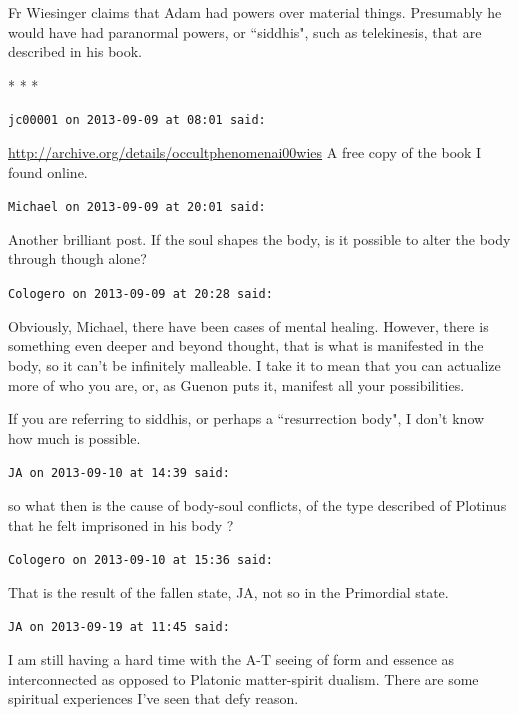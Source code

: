 Fr Wiesinger claims that Adam had powers over material things. Presumably he would have had paranormal powers, or ``siddhis", such as telekinesis, that are described in his book.



\begin{center}* * *\end{center}

\begin{footnotesize}\begin{sffamily}

\texttt{jc00001 on 2013-09-09 at 08:01 said: }

\url{http://archive.org/details/occultphenomenai00wies} A free copy of the book I found online.


\hfill

\texttt{Michael on 2013-09-09 at 20:01 said: }

Another brilliant post. If the soul shapes the body, is it possible to alter the body through though alone?


\hfill

\texttt{Cologero on 2013-09-09 at 20:28 said: }

Obviously, Michael, there have been cases of mental healing. However, there is something even deeper and beyond thought, that is what is manifested in the body, so it can't be infinitely malleable. I take it to mean that you can actualize more of who you are, or, as Guenon puts it, manifest all your possibilities.

If you are referring to siddhis, or perhaps a ``resurrection body", I don't know how much is possible.


\hfill

\texttt{JA on 2013-09-10 at 14:39 said: }

so what then is the cause of body-soul conflicts, of the type described of Plotinus that he felt imprisoned in his body ?


\hfill

\texttt{Cologero on 2013-09-10 at 15:36 said: }

That is the result of the fallen state, JA, not so in the Primordial state.


\hfill

\texttt{JA on 2013-09-19 at 11:45 said: }

I am still having a hard time with the A-T seeing of form and essence as interconnected as opposed to Platonic matter-spirit dualism. There are some spiritual experiences I've seen that defy reason. 


\end{sffamily}
\end{footnotesize}
